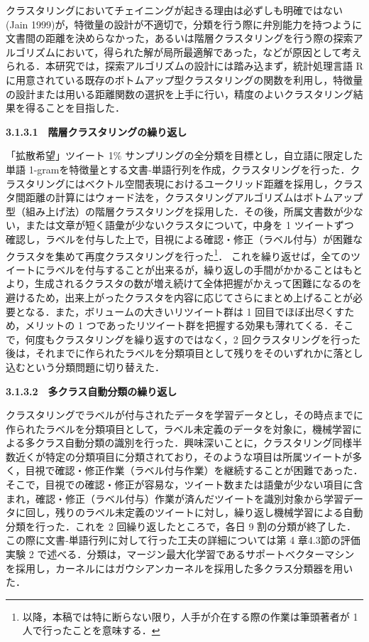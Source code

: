 \documentclass[japanese]{jnlp_1.4}
\begin{document}
クラスタリングにおいてチェイニングが起きる理由は必ずしも明確ではない(Jain 1999)が，特徴量の設計が不適切で，分類を行う際に弁別能力を持つように文書間の距離を決めらなかった，あるいは階層クラスタリングを行う際の探索アルゴリズムにおいて，得られた解が局所最適解であった，などが原因として考えられる．本研究では，探索アルゴリズムの設計には踏み込まず，統計処理言語 R に用意されている既存のボトムアップ型クラスタリングの関数を利用し，特徴量の設計または用いる距離関数の選択を上手に行い，精度のよいクラスタリング結果を得ることを目指した．


\noindent\textbf{3.1.3.1　階層クラスタリングの繰り返し}

「拡散希望」ツイート 1\% サンプリングの全分類を目標とし，自立語に限定した単語 1-gramを特徴量とする文書‐単語行列を作成，クラスタリングを行った．クラスタリングにはベクトル空間表現におけるユークリッド距離を採用し，クラスタ間距離の計算にはウォード法を，クラスタリングアルゴリズムはボトムアップ型（組み上げ法）の階層クラスタリングを採用した．その後，所属文書数が少ない，または文章が短く語彙が少ないクラスタについて，中身を 1 ツイートずつ確認し，ラベルを付与した上で，目視による確認・修正（ラベル付与）が困難なクラスタを集めて再度クラスタリングを行った\footnote{以降，本稿では特に断らない限り，人手が介在する際の作業は筆頭著者が 1 人で行ったことを意味する．}．
これを繰り返せば，全てのツイートにラベルを付与することが出来るが，繰り返しの手間がかかることはもとより，生成されるクラスタの数が増え続けて全体把握がかえって困難になるのを避けるため，出来上がったクラスタを内容に応じてさらにまとめ上げることが必要となる．また，ボリュームの大きいリツイート群は 1 回目でほぼ出尽くすため，メリットの 1 つであったリツイート群を把握する効果も薄れてくる．そこで，何度もクラスタリングを繰り返すのではなく，2 回クラスタリングを行った後は，それまでに作られたラベルを分類項目として残りをそのいずれかに落とし込むという分類問題に切り替えた．


\noindent\textbf{3.1.3.2　多クラス自動分類の繰り返し}

クラスタリングでラベルが付与されたデータを学習データとし，その時点までに作られたラベルを分類項目として，ラベル未定義のデータを対象に，機械学習による多クラス自動分類の識別を行った．興味深いことに，クラスタリング同様半数近くが特定の分類項目に分類されており，そのような項目は所属ツイートが多く，目視で確認・修正作業（ラベル付与作業）を継続することが困難であった．そこで，目視での確認・修正が容易な，ツイート数または語彙が少ない項目に含まれ，確認・修正（ラベル付与）作業が済んだツイートを識別対象から学習データに回し，残りのラベル未定義のツイートに対し，繰り返し機械学習による自動分類を行った．これを 2 回繰り返したところで，各日 9 割の分類が終了した．この際に文書‐単語行列に対して行った工夫の詳細については第 4 章4.3節の評価実験 2 で述べる．分類は，マージン最大化学習であるサポートベクターマシンを採用し，カーネルにはガウシアンカーネルを採用した多クラス分類器を用いた．
\end{document}
